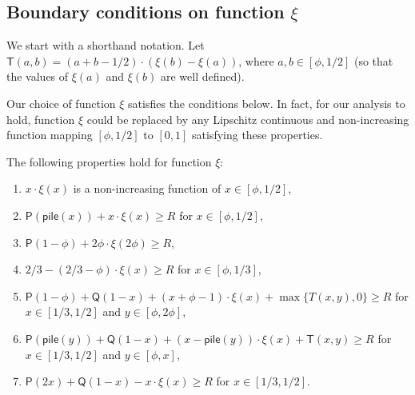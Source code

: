 \documentclass[a4paper,USenglish,cleveref]{lipics-v2019}
\newcommand{\R}{\ensuremath{R}}
\newcommand{\smallBoundary}{\ensuremath{\phi}}
\newcommand{\g}{\ensuremath{\xi}}
\newcommand{\water}{\textsf{Q}}
\newcommand{\cutintegral}{\textsf{P}}
\newcommand{\stack}{\textsf{pile}}
\newcommand{\T}{\textsf{T}}
\begin{document}
 


\subsection{Boundary conditions on function \texorpdfstring{\g}{xi}}
\label{sec:boundary}

We start with a shorthand notation. Let $\T(a,b)  =  (a+b-1/2) \cdot (\g(b) - \g(a))$,
where $a, b \in [\smallBoundary, 1/2]$ (so that the values of $\g(a)$ and
$\g(b)$ are well defined).

Our choice of function $\g$ satisfies the conditions below. In fact, for our
analysis to hold, function $\g$ could be replaced by any Lipschitz continuous
and non-increasing function mapping $[\smallBoundary, 1/2]$ to $[0,1]$
satisfying these properties.

\begin{lemma}
\label{lem:g-properties}
The following properties hold for function $\g$:
\begin{enumerate}
  \item $x \cdot \g(x)$ is a non-increasing function of $x \in [\smallBoundary, 1/2]$,
    \label{item:g-area}
  \item 
    $\cutintegral(\stack(x)) + x \cdot \g(x) \geq \R$ for $x \in [\smallBoundary,1/2]$,
    \label{item:g-prop-0}
  \item 
    $\cutintegral(1-\smallBoundary) + 2 \smallBoundary \cdot \g(2 \smallBoundary) \geq \R$,
    \label{item:g-prop-phi}
  \item $2/3 - (2/3 - \smallBoundary) \cdot \g(x) \geq \R$ for $x \in [\smallBoundary, 1/3]$,
    \label{item:g-upper-bound}
  \item
    $\cutintegral(1-\smallBoundary) + \water(1-x) + (x+\smallBoundary-1) \cdot \g(x) + \max\{T(x,y),0\}
    \geq \R$
      for $x \in [1/3, 1/2]$ and $y \in [\smallBoundary, 2 \smallBoundary]$,
    \label{item:g-2dim-1}
  \item 
    $\cutintegral(\stack(y)) + \water(1-x) + (x - \stack(y)) \cdot \g(x) + \T(x,y) \geq \R$
    for $x \in [1/3, 1/2]$ and $y \in [\smallBoundary, x]$,
    \label{item:g-2dim-2}
  \item 
    $\cutintegral(2x) + \water(1-x)  - x \cdot \g(x) \geq \R$ for $x \in [1/3,1/2]$.
    \label{item:g-prop-1}
\end{enumerate}
\end{lemma}
  
\end{document}
